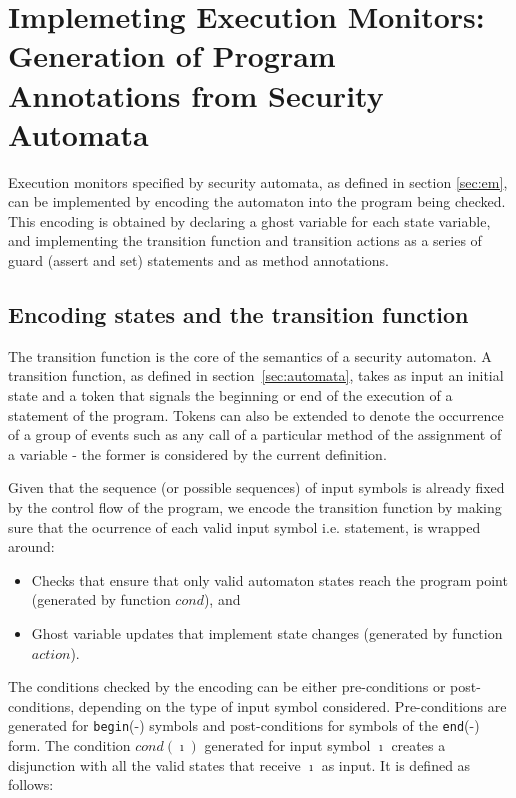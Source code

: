 \documentclass[10pt,notitlepage,twoside]{article}
\begin{document}
\section{Implemeting Execution Monitors: Generation of Program Annotations from Security Automata}\label{sec:annotation}

Execution monitors specified by security automata, as defined in section \ref{sec:em}, can be implemented by encoding the automaton into the program being checked.
This encoding is obtained by declaring a ghost variable for each state variable, and implementing the transition function and transition actions as a series of guard (assert and set) statements and as method annotations.


\subsection{Encoding states and the transition function}

The transition function is the core of the semantics of a security automaton.
A transition function, as  defined in section~\ref{sec:automata}, takes as input an initial state and a token that signals the beginning or end of the execution of a  statement of the program. Tokens can also be extended to denote the occurrence of a group of events such as any call of a particular method of the assignment of a variable - the former is considered by the current definition.


Given that the sequence (or possible sequences)  of input symbols is already fixed by the control flow of the program, we encode the transition function by making sure that the ocurrence of each valid input symbol i.e. statement, is wrapped around:
\begin{itemize}
\item Checks that ensure that only valid automaton states reach the program point (generated by function $\mathit{cond}$), and
\item Ghost variable updates that implement state changes (generated by function $\mathit{action}$). 
\end{itemize}

The conditions checked by the encoding can be either pre-conditions or post-conditions, depending on the type of input symbol considered. Pre-conditions are generated for \texttt{begin}(-) symbols and post-conditions for symbols of the \texttt{end}(-) form.
The condition $\mathit{cond}(\imath)$ generated for input symbol $\imath$ creates a disjunction with all the valid states that receive $\imath$ as input. It  is defined as follows:
\end{document}
